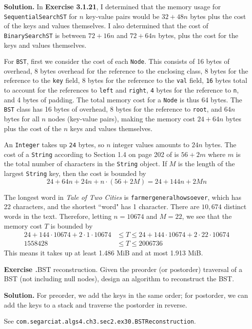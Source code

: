 \documentclass[12pt, a4paper]{article}
\newenvironment{ex}[2][Exercise]
{\par\medskip\noindent \textbf{#1 #2.}}
{\medskip}
\newenvironment{sol}[1][Solution]
{\par\medskip\noindent \textbf{#1.} }
{\medskip}
\begin{document}
	\begin{sol}
		In \textbf{Exercise 3.1.21}, I determined that the memory usage for \texttt{SequentialSearchST}
		for $n$ key-value pairs would be $32+48n$ bytes plus the cost of the keys and values
		themselves. I also determined that the cost of \texttt{BinarySearchST} is between $72+16n$
		and $72+64n$ bytes, plus the cost for the keys and values themselves.
		
		For \texttt{BST}, first we consider the cost of each \texttt{Node}. This consists
		of 16 bytes of overhead, 8 bytes overhead for the reference to the enclosing class, 8
		bytes for the reference to the \texttt{key} field, 8 bytes for the reference
		to the \texttt{val} field, \texttt{16} bytes total to account for the references
		to \texttt{left} and \texttt{right}, \texttt{4} bytes for the reference to
		\texttt{n}, and 4 bytes of padding. The total memory cost for a \texttt{Node} is
		thus 64 bytes. The \texttt{BST} class has 16 bytes of overhead, 8 bytes for the
		reference to \texttt{root}, and $64n$ bytes for all $n$ nodes (key-value pairs),
		making the memory cost $24+64n$ bytes
		plus the cost of the $n$ keys and values themselves.
		
		An \texttt{Integer} takes up \texttt{24} bytes, so $n$ integer values amounts to
		$24n$ bytes. The cost of a \texttt{String} according to Section 1.4 on page
		202 of \cite{sedgewick_wayne} is $56+2m$ where $m$ is the total number of characters in
		the \texttt{String} object. If $M$ is the length of the largest \texttt{String}
		key, then the cost is bounded by
		\[
		24+64n+24n+n\cdot (56+2M)=24+144n+2Mn
		\]
		
		The longest word in \emph{Tale of Two Cities} is \texttt{farmergeneralhowsoever},
		which has 22 characters, and the shortest ``word" has 1 character. There are
		$10,674$ distinct words in the text. Therefore, letting $n=10674$ and $M=22$,
		we see that the memory cost $T$ is bounded by
		\begin{align*}
			24+144\cdot 10674+2\cdot 1\cdot 10674&\leq T\leq 24+144\cdot 10674+2\cdot 22\cdot 10674\\
			1558428& \leq T\leq 2006736
		\end{align*}
		This means it takes up at least 1.486 MiB and at most 1.913 MiB.
	\end{sol}
	\begin{ex}{30}
		\emph{BST reconstruction}. Given the preorder (or postorder) traversal of a BST
		(not including null nodes), design an algorithm to reconstruct the BST.
	\end{ex}
	\begin{sol}
		For preorder, we add the keys in the same order; for postorder, we can add
		the keys to a stack and traverse the postorder in reverse.
		
		See \texttt{com.segarciat.algs4.ch3.sec2.ex30.BSTReconstruction}.
	\end{sol}
	\pagebreak
	\printbibliography
\end{document}
